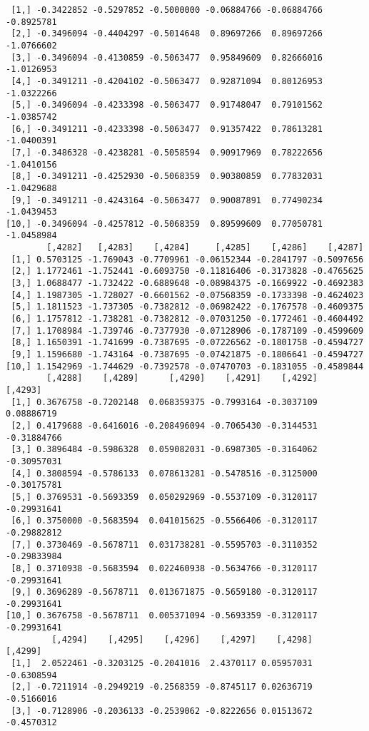 \documentclass[
  letterpaper,
  DIV=11,
  numbers=noendperiod]{scrreprt}
\begin{document}
\begin{verbatim}
 [1,] -0.3422852 -0.5297852 -0.5000000 -0.06884766 -0.06884766 -0.8925781
 [2,] -0.3496094 -0.4404297 -0.5014648  0.89697266  0.89697266 -1.0766602
 [3,] -0.3496094 -0.4130859 -0.5063477  0.95849609  0.82666016 -1.0126953
 [4,] -0.3491211 -0.4204102 -0.5063477  0.92871094  0.80126953 -1.0322266
 [5,] -0.3496094 -0.4233398 -0.5063477  0.91748047  0.79101562 -1.0385742
 [6,] -0.3491211 -0.4233398 -0.5063477  0.91357422  0.78613281 -1.0400391
 [7,] -0.3486328 -0.4238281 -0.5058594  0.90917969  0.78222656 -1.0410156
 [8,] -0.3491211 -0.4252930 -0.5068359  0.90380859  0.77832031 -1.0429688
 [9,] -0.3491211 -0.4243164 -0.5063477  0.90087891  0.77490234 -1.0439453
[10,] -0.3496094 -0.4257812 -0.5068359  0.89599609  0.77050781 -1.0458984
        [,4282]   [,4283]    [,4284]     [,4285]    [,4286]    [,4287]
 [1,] 0.5703125 -1.769043 -0.7709961 -0.06152344 -0.2841797 -0.5097656
 [2,] 1.1772461 -1.752441 -0.6093750 -0.11816406 -0.3173828 -0.4765625
 [3,] 1.0688477 -1.732422 -0.6889648 -0.08984375 -0.1669922 -0.4692383
 [4,] 1.1987305 -1.728027 -0.6601562 -0.07568359 -0.1733398 -0.4624023
 [5,] 1.1811523 -1.737305 -0.7382812 -0.06982422 -0.1767578 -0.4609375
 [6,] 1.1757812 -1.738281 -0.7382812 -0.07031250 -0.1772461 -0.4604492
 [7,] 1.1708984 -1.739746 -0.7377930 -0.07128906 -0.1787109 -0.4599609
 [8,] 1.1650391 -1.741699 -0.7387695 -0.07226562 -0.1801758 -0.4594727
 [9,] 1.1596680 -1.743164 -0.7387695 -0.07421875 -0.1806641 -0.4594727
[10,] 1.1542969 -1.744629 -0.7392578 -0.07470703 -0.1831055 -0.4589844
        [,4288]    [,4289]      [,4290]    [,4291]    [,4292]     [,4293]
 [1,] 0.3676758 -0.7202148  0.068359375 -0.7993164 -0.3037109  0.08886719
 [2,] 0.4179688 -0.6416016 -0.208496094 -0.7065430 -0.3144531 -0.31884766
 [3,] 0.3896484 -0.5986328  0.059082031 -0.6987305 -0.3164062 -0.30957031
 [4,] 0.3808594 -0.5786133  0.078613281 -0.5478516 -0.3125000 -0.30175781
 [5,] 0.3769531 -0.5693359  0.050292969 -0.5537109 -0.3120117 -0.29931641
 [6,] 0.3750000 -0.5683594  0.041015625 -0.5566406 -0.3120117 -0.29882812
 [7,] 0.3730469 -0.5678711  0.031738281 -0.5595703 -0.3110352 -0.29833984
 [8,] 0.3710938 -0.5683594  0.022460938 -0.5634766 -0.3120117 -0.29931641
 [9,] 0.3696289 -0.5678711  0.013671875 -0.5659180 -0.3120117 -0.29931641
[10,] 0.3676758 -0.5678711  0.005371094 -0.5693359 -0.3120117 -0.29931641
         [,4294]    [,4295]    [,4296]    [,4297]    [,4298]    [,4299]
 [1,]  2.0522461 -0.3203125 -0.2041016  2.4370117 0.05957031 -0.6308594
 [2,] -0.7211914 -0.2949219 -0.2568359 -0.8745117 0.02636719 -0.5166016
 [3,] -0.7128906 -0.2036133 -0.2539062 -0.8222656 0.01513672 -0.4570312

\end{verbatim}
\end{document}
